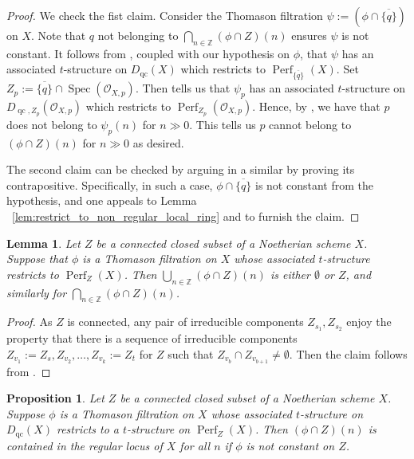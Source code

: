 \documentclass[11pt]{amsart}
\theoremstyle{plain}
\newtheorem{lemma}[theorem]{Lemma}
\newtheorem{proposition}[theorem]{Proposition}
\theoremstyle{definition}
\numberwithin{equation}{section}
\numberwithin{theorem}{section}
\begin{document}
\begin{proof}
    We check the fist claim. Consider the Thomason filtration $\psi:=(\phi\cap \overline{\{q\}})$ on $X$. Note that $q$ not belonging to $\bigcap_{n\in \mathbb{Z}} (\phi\cap Z)(n)$ ensures $\psi$ is not constant. It follows from , coupled with our hypothesis on $\phi$, that $\psi$ has an associated $t$-structure on $D_{\operatorname{qc}}(X)$ which restricts to $\operatorname{Perf}_{\overline{\{q\}}}(X)$. Set $Z_p:=\overline{\{q\}}\cap \operatorname{Spec}(\mathcal{O}_{X,p})$. Then  tells us that $\psi_p$ has an associated $t$-structure on $D_{\operatorname{qc},Z_p}(\mathcal{O}_{X,p})$ which restricts to $\operatorname{Perf}_{Z_p} (\mathcal{O}_{X,p})$. Hence, by , we have that $p$ does not belong to $\psi_p(n)$ for $n\gg 0$. This tells us $p$ cannot belong to $(\phi\cap Z)(n)$ for $n\gg 0$ as desired. 
    
    The second claim can be checked by arguing in a similar by proving its contrapositive. Specifically, in such a case, $\phi\cap \overline{\{ q\}}$ is not constant from the hypothesis, and one appeals to Lemma ~\ref{lem:restrict_to_non_regular_local_ring} and  to furnish the claim.
\end{proof}

\begin{lemma}\label{lem:absolute_behavior_union_intersection}
    Let $Z$ be a connected closed subset of a Noetherian scheme $X$. Suppose that $\phi$ is a Thomason filtration on $X$ whose associated $t$-structure restricts to $\operatorname{Perf}_Z(X)$. Then $\bigcup_{n\in \mathbb{Z}} (\phi \cap Z)(n)$ is either $\emptyset$ or $Z$, and similarly for $\bigcap_{n\in \mathbb{Z}} (\phi \cap Z)(n)$.
\end{lemma}

\begin{proof}
    As $Z$ is connected, any pair of irreducible components $Z_{s_1},Z_{s_2}$ enjoy the property that there is a sequence of irreducible components $Z_{v_1}:=Z_s,Z_{v_2},\ldots, Z_{v_k}:=Z_t$ for $Z$ such that $Z_{v_b}\cap Z_{v_{b+1}}\not= \emptyset$. Then the claim follows from .
\end{proof}

\begin{proposition}\label{prop:restrictability_implies_regular_locus_containment}
    Let $Z$ be a connected closed subset of a Noetherian scheme $X$. Suppose $\phi$ is a Thomason filtration on $X$ whose associated $t$-structure on $D_{\operatorname{qc}}(X)$ restricts to a $t$-structure on $\operatorname{Perf}_Z(X)$. Then $(\phi\cap Z)(n)$ is contained in the regular locus of $X$ for all $n$ if $\phi$ is not constant on $Z$.
\end{proposition}
\end{document}
